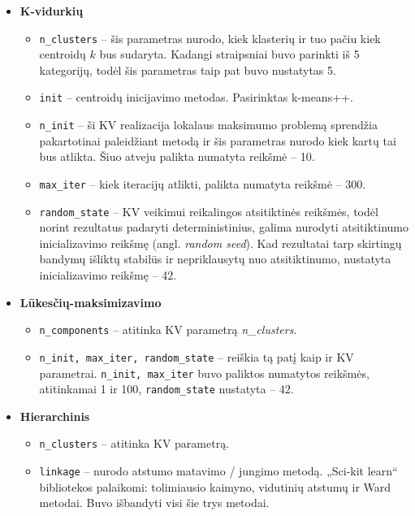 \documentclass{VUMIFInfBakalaurinis}
\begin{document}
\begin{itemize}
\item
  \textbf{K-vidurkių}

  \begin{itemize}
  \item
    \texttt{n\_clusters} -- šis parametras nurodo, kiek klasterių ir tuo
    pačiu kiek centroidų $k$ bus sudaryta. Kadangi straipsniai buvo
    parinkti iš 5 kategorijų, todėl šis parametras taip pat buvo
    nustatytas 5.
  \item
    \texttt{init} -- centroidų inicijavimo metodas. Pasirinktas k-means++.
  \item
    \texttt{n\_init} -- ši KV realizacija lokalaus maksimumo problemą
    sprendžia pakartotinai paleidžiant metodą ir šis parametras nurodo
    kiek kartų tai bus atlikta. Šiuo atveju palikta numatyta reikšmė --
    10.
  \item
    \texttt{max\_iter} -- kiek iteracijų atlikti, palikta numatyta reikšmė
    -- 300.
  \item
    \texttt{random\_state} -- KV veikimui reikalingos atsitiktinės
    reikšmės, todėl norint rezultatus padaryti deterministinius, galima
    nurodyti atsitiktinumo inicializavimo reikšmę (angl. \emph{random
    seed}). Kad rezultatai tarp skirtingų bandymų išliktų stabilūs ir
    nepriklausytų nuo atsitiktinumo, nustatyta inicializavimo reikšmę --
    42.
  \end{itemize}
\item
  \textbf{Lūkesčių-maksimizavimo}

  \begin{itemize}
  \item
    \texttt{n\_components} -- atitinka KV parametrą \emph{n\_clusters}.
  \item
    \texttt{n\_init, max\_iter, random\_state} -- reiškia tą patį kaip ir
    KV parametrai. \texttt{n\_init, max\_iter} buvo paliktos numatytos
    reikšmės, atitinkamai 1 ir 100, \texttt{random\_state} nustatyta --
    42.
  \end{itemize}
\item
  \textbf{Hierarchinis}

  \begin{itemize}
  \item
    \texttt{n\_clusters} -- atitinka KV parametrą.
  \item
    \texttt{linkage} -- nurodo atstumo matavimo / jungimo metodą. „Sci-kit
    learn“ bibliotekos palaikomi: tolimiausio kaimyno, vidutinių atstumų
    ir Ward metodai. Buvo išbandyti visi šie trys metodai.
  \end{itemize}
\end{itemize}
\end{document}

